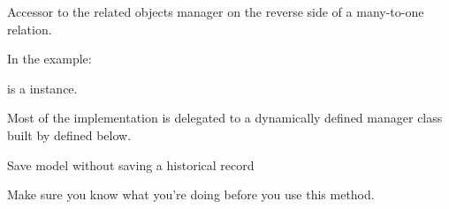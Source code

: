 \documentclass[letterpaper,10pt,english]{sphinxmanual}
\begin{document}
\begin{fulllineitems}
\begin{fulllineitems}
\label{\detokenize{modules/models:preferences.models.PaymentMethod.objects}}
\end{fulllineitems}


\begin{fulllineitems}
\label{\detokenize{modules/models:preferences.models.PaymentMethod.reload_set}}
Accessor to the related objects manager on the reverse side of a
many-to-one relation.

In the example:

\begin{sphinxVerbatim}[commandchars=\\\{\}]
 
       
\end{sphinxVerbatim}

 is a  instance.

Most of the implementation is delegated to a dynamically defined manager
class built by  defined below.

\end{fulllineitems}


\begin{fulllineitems}
\label{\detokenize{modules/models:preferences.models.PaymentMethod.save_without_historical_record}}
Save model without saving a historical record

Make sure you know what you’re doing before you use this method.

\end{fulllineitems}


\end{fulllineitems}
\end{document}
